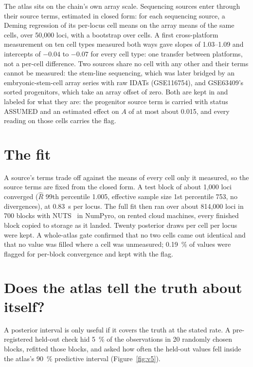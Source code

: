 The atlas sits on the chain's own array scale. Sequencing sources enter through their source terms, estimated in closed form: for each sequencing
source, a Deming regression of its per-locus cell means on the array means of the same cells, over 50,000 loci, with a bootstrap over cells. A first
cross-platform measurement on ten cell types measured both ways gave slopes of 1.03--1.09 and intercepts of $-0.04$ to $-0.07$ for every cell type:
one transfer between platforms, not a per-cell difference. \measured{} Two sources share no cell with any other and their terms cannot be measured:
the stem-line sequencing, which was later bridged by an embryonic-stem-cell array series with raw IDATs (GSE116754), and GSE63409's sorted
progenitors, which take an array offset of zero. Both are kept in and labeled for what they are: the progenitor source term
is carried with status ASSUMED and an estimated effect on $A$ of at most about 0.015, and every reading on those cells carries the flag.

\section{The fit}

A source's terms trade off against the means of every cell only it measured, so the source terms are fixed from the closed form. A test block of about 1,000 loci converged
($\hat R$ 99th percentile 1.005, effective sample size 1st percentile 753, no divergences), at 0.83~s per locus. The full fit then ran over about
814,000 loci in 700 blocks with NUTS~\cite{Hoffman2014} in NumPyro, on rented cloud machines, every finished block copied to storage as it landed.
Twenty posterior draws per cell per locus were kept. A whole-atlas gate confirmed that no two cells came out identical and that no value was filled
where a cell was unmeasured; 0.19~\% of values were flagged for per-block convergence and kept with the flag. \measured

\section{Does the atlas tell the truth about itself?}

A posterior interval is only useful if it covers the truth at the stated rate. A pre-registered held-out check hid 5~\% of the observations in 20 randomly chosen blocks, refitted
those blocks, and asked how often the held-out values fell inside the atlas's 90~\% predictive interval (Figure~\ref{fig:v5}). \measured

